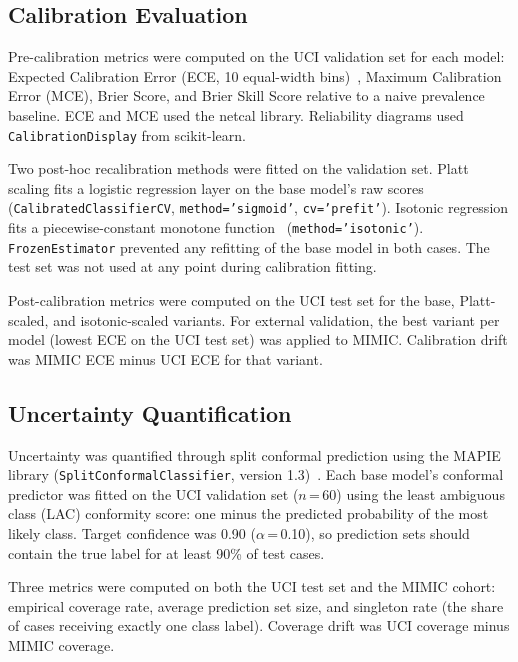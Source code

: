\subsection{Calibration Evaluation}

Pre-calibration metrics were computed on the UCI validation set for each model: Expected Calibration Error (ECE, 10 equal-width bins)~\cite{Guo2017}, Maximum Calibration Error (MCE), Brier Score, and Brier Skill Score relative to a naive prevalence baseline. ECE and MCE used the netcal library. Reliability diagrams used \texttt{CalibrationDisplay} from scikit-learn.

Two post-hoc recalibration methods were fitted on the validation set. Platt scaling fits a logistic regression layer on the base model's raw scores~\cite{Platt1999} (\texttt{CalibratedClassifierCV}, \texttt{method='sigmoid'}, \texttt{cv='prefit'}). Isotonic regression fits a piecewise-constant monotone function~\cite{Zadrozny2002} (\texttt{method='isotonic'}). \texttt{FrozenEstimator} prevented any refitting of the base model in both cases. The test set was not used at any point during calibration fitting.

Post-calibration metrics were computed on the UCI test set for the base, Platt-scaled, and isotonic-scaled variants. For external validation, the best variant per model (lowest ECE on the UCI test set) was applied to MIMIC. Calibration drift was MIMIC ECE minus UCI ECE for that variant.

\subsection{Uncertainty Quantification}

Uncertainty was quantified through split conformal prediction using the MAPIE library (\texttt{SplitConformalClassifier}, version 1.3)~\cite{Taquet2022,AngelopoulosBates2022}. Each base model's conformal predictor was fitted on the UCI validation set ($n$\,=\,60) using the least ambiguous class (LAC) conformity score: one minus the predicted probability of the most likely class. Target confidence was 0.90 ($\alpha$\,=\,0.10), so prediction sets should contain the true label for at least 90\% of test cases.

Three metrics were computed on both the UCI test set and the MIMIC cohort: empirical coverage rate, average prediction set size, and singleton rate (the share of cases receiving exactly one class label). Coverage drift was UCI coverage minus MIMIC coverage.

